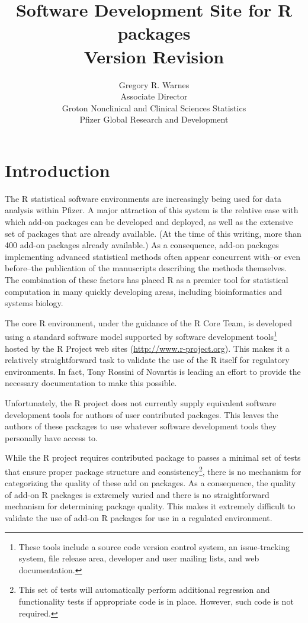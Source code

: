\documentclass[12pt]{article}
\title{Software Development Site for R packages\\
       Version $ $Revision$ $ }
\author{Gregory R. Warnes\\
  Associate Director\\
  Groton Nonclinical and Clinical Sciences Statistics\\
  Pfizer Global Research and Development}
\begin{document}
\maketitle

\section{Introduction}

The R statistical software environments are increasingly being used
for data analysis within Pfizer.  A major attraction of this system is
the relative ease with which add-on packages can be developed and
deployed, as well as the extensive set of packages that are already
available.  (At the time of this writing, more than 400 add-on
packages already available.)  As a consequence, add-on packages
implementing advanced statistical methods often appear concurrent
with--or even before--the publication of the manuscripts describing
the methods themselves.  The combination of these factors has placed R
as a premier tool for statistical computation in many quickly
developing areas, including bioinformatics and systems biology.

The core R environment, under the guidance of the R Core Team, is
developed using a standard software model supported by software
development tools\footnote{These tools include a source code version
  control system, an issue-tracking system, file release area,
  developer and user mailing lists, and web documentation.}  hosted by
the R Project web sites (\url{http://www.r-project.org}).  This makes it a
relatively straightforward task to validate the use of the R itself
for regulatory environments.  In fact, Tony Rossini of Novartis is
leading an effort to provide the necessary documentation to make this
possible.

Unfortunately, the R project does not currently supply equivalent
software development tools for authors of user contributed packages.
This leaves the authors of these packages to use whatever software
development tools they personally have access to.

While the R project requires contributed package to passes a minimal
set of tests that ensure proper package structure and
consistency\footnote{This set of tests will automatically perform
  additional regression and functionality tests if appropriate code is
  in place.  However, such code is not required.}, there is no
mechanism for categorizing the quality of these add on packages.  As a
consequence, the quality of add-on R packages is extremely varied and
there is no straightforward mechanism for determining package quality.
This makes it extremely difficult to validate the use of add-on R
packages for use in a regulated environment.
\end{document}
